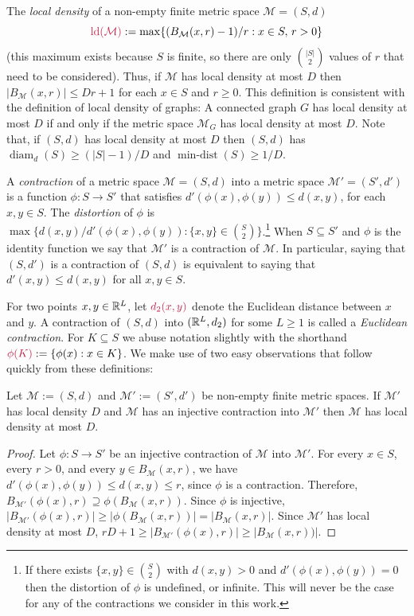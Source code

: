 \documentclass{patmorin}
\makeatletter
\renewcommand{\ge}{\geqslant}
\renewcommand{\le}{\leqslant}
\newcommand{\gwen}[1]{\textcolor{Purple}{Gwen: #1}}
\newcommand{\defin}[1]{\emph{\textcolor{brightmaroon}{#1}}}
\def\mathcolor#1#{\@mathcolor{#1}}
\def\@mathcolor#1#2#3{%
  \protect\leavevmode
  \begingroup
    \color#1{#2}#3%
  \endgroup
}
\newcommand{\mathdefin}[1]{\mathcolor{brightmaroon}{#1}}
\DeclareMathOperator{\diam}{diam}
\DeclareMathOperator{\mindist}{min-dist}
\DeclareMathOperator{\ld}{ld}
\makeatother
\begin{document}
The \defin{local density} of a non-empty finite metric space  $\mathcal{M}=(S,d)$
\[
  \mathdefin{\ld(\mathcal{M})}:=\max\{(B_{\mathcal{M}}(x,r)-1)/r:x\in S,\, r>0\}
\]
(this maximum exists because $S$ is finite, so there are only $\binom{|S|}{2}$ values of $r$ that need to be considered).
Thus, if $\mathcal{M}$ has local density at most $D$ then $|B_{\mathcal{M}}(x,r)|\le Dr+1$ for each $x\in S$ and $r\ge 0$.
This definition is consistent with the definition of local density of graphs:  A connected graph $G$ has local density at most $D$ if and only if the metric space $\mathcal{M}_G$ has local density at most $D$.  Note that, if $(S,d)$ has local density at most $D$ then $(S,d)$ has $\diam_d(S)\ge (|S|-1)/D$ and $\mindist(S)\ge 1/D$.

A \defin{contraction} of a metric space $\mathcal{M}=(S,d)$ into a metric space $\mathcal{M'}=(S',d')$ is a function $\phi:S\to S'$ that satisfies $d'(\phi(x),\phi(y))\le d(x,y)$, for each $x,y\in S$. The \defin{distortion} of $\phi$ is $\max\{d(x,y)/d'(\phi(x),\phi(y)):\{x,y\}\in \binom{S}{2}\}$.\footnote{If there exists $\{x,y\}\in \binom{S}{2}$ with $d(x,y)>0$ and $d'(\phi(x),\phi(y))=0$ then the distortion of $\phi$ is undefined, or infinite. This will never be the case for any of the contractions we consider in this work.}  When $S\subseteq S'$ and $\phi$ is the identity function we say that $\mathcal{M'}$ is a contraction of $\mathcal{M}$. In particular, saying that $(S,d')$ is a contraction of $(S,d)$ is equivalent to saying that $d'(x,y)\le d(x,y)$ for all $x,y\in S$.

For two points $x,y\in\mathbb{R}^L$, let $\mathdefin{d_2(x,y)}$ denote the Euclidean distance between $x$ and $y$.  A contraction of $(S,d)$ into $(\mathbb{R}^L, d_2)$ for some $L\ge 1$ is called a \defin{Euclidean contraction}.  For $K\subseteq S$ we abuse notation slightly with the shorthand $\mathdefin{\phi(K)}:=\{\phi(x):x\in K\}$.   We make use of two easy observations that follow quickly from these definitions:

\begin{obs}\label{contraction_increases_density}
  Let $\mathcal{M}:=(S,d)$ and $\mathcal{M}':=(S',d')$ be non-empty finite metric spaces.  If $\mathcal{M'}$ has local density $D$ and $\mathcal{M}$ has an injective contraction into $\mathcal{M}'$ then  $\mathcal{M}$ has local density at most $D$.
\end{obs}

\begin{proof}

  Let $\phi:S\to S'$ be an injective contraction of $\mathcal{M}$ into $\mathcal{M}'$.  For every $x\in S$, every $r > 0$, and every $y\in B_\mathcal{M}(x,r)$, we have $d'(\phi(x),\phi(y))\le d(x,y)\le r$, since $\phi$ is a contraction.  Therefore, $B_{\mathcal{M'}}(\phi(x),r)\supseteq \phi(B_{\mathcal{M}}(x,r))$.  Since $\phi$ is injective, $|B_{\mathcal{M'}}(\phi(x),r)|\ge |\phi(B_{\mathcal{M}}(x,r))|=|B_{\mathcal{M}}(x,r)|$.
  Since $\mathcal{M}'$ has local density at most $D$, $rD+1\ge |B_{\mathcal{M'}}(\phi(x),r)|\ge  |B_{\mathcal{M}}(x,r))|$.
\end{proof}
\end{document}
